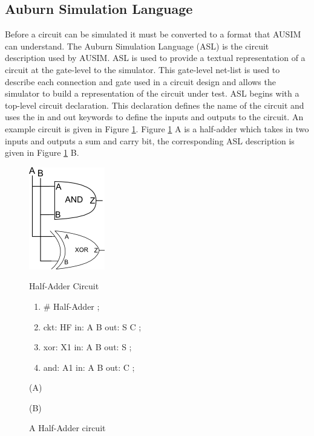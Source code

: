 \documentclass[12pt]{report}
\begin{document}
\subsection{Auburn Simulation Language}
Before a circuit can be simulated it must be converted to a format that AUSIM can understand.  The Auburn Simulation Language (ASL) is the circuit description used by AUSIM\cite{asl}.  ASL is used to provide a textual representation of a circuit at the gate-level to the simulator.  This gate-level net-list is used to describe each connection and gate used in a circuit design and allows the simulator to build a representation of the circuit under test.  ASL begins with a top-level circuit declaration.  This declaration defines the name of the circuit and uses the in and out keywords to define the inputs and outputs to the circuit.  An example circuit is given in Figure \ref{fig:half_adder}.  Figure \ref{fig:half_adder} A is a half-adder which takes in two inputs and outputs a sum and carry bit, the corresponding ASL description is given in Figure \ref{fig:half_adder} B.
\begin{figure}
	\begin{center}
		\begin{minipage}[l]{.45\textwidth}
			\includegraphics[scale=1]{images/half-adder}	
		\end{minipage}
		\begin{minipage}[r]{.45\textwidth}
			\begin{center}
				Half-Adder Circuit
			\end{center}
			\begin{enumerate}
				\setlength{\itemsep}{0cm}
				\item \# Half-Adder ;
				\item ckt: HF in: A B out: S C ;
				\item xor: X1 in: A B out: S ;
				\item and: A1 in: A B out: C ;
			\end{enumerate}
		\end{minipage}
	\end{center}
	\begin{center}
		\begin{minipage}[l]{.45\textwidth}
			(A)
		\end{minipage}
		\begin{minipage}[r]{.45\textwidth}
			(B)
		\end{minipage}
	\end{center}
	\caption{A Half-Adder circuit}
	\label{fig:half_adder}
\end{figure}
\end{document}
